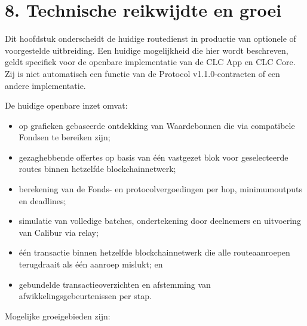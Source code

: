 \documentclass[11pt]{article}
\begin{document}
\section*{8. Technische reikwijdte en groei}

Dit hoofdstuk onderscheidt de huidige routedienst in productie van optionele of voorgestelde uitbreiding. Een huidige mogelijkheid die hier wordt beschreven, geldt specifiek voor de openbare implementatie van de CLC App en CLC Core. Zij is niet automatisch een functie van de Protocol v1.1.0-contracten of een andere implementatie.

De huidige openbare inzet omvat:

\begin{itemize}[leftmargin=*]
\item op grafieken gebaseerde ontdekking van Waardebonnen die via compatibele Fondsen te bereiken zijn;
\item gezaghebbende offertes op basis van één vastgezet blok voor geselecteerde routes binnen hetzelfde blockchainnetwerk;
\item berekening van de Fonds- en protocolvergoedingen per hop, minimumoutputs en deadlines;
\item simulatie van volledige batches, ondertekening door deelnemers en uitvoering van Calibur via relay;
\item één transactie binnen hetzelfde blockchainnetwerk die alle routeaanroepen terugdraait als één aanroep mislukt; en
\item gebundelde transactieoverzichten en afstemming van afwikkelingsgebeurtenissen per stap.
\end{itemize}
Mogelijke groeigebieden zijn:
\end{document}
